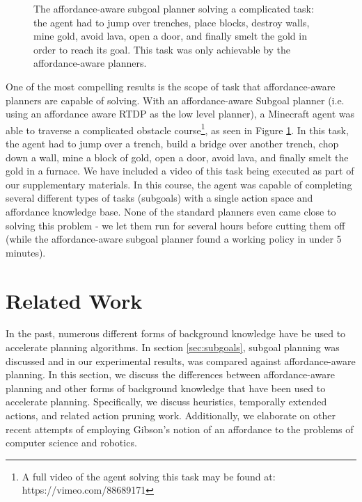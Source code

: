 \documentclass[]{article}
\begin{document}
\begin{figure}
\centering
%
%
%
%
  \caption{The affordance-aware subgoal planner solving a complicated task: the agent had to jump over trenches,
  place blocks, destroy walls, mine gold, avoid lava, open a door, and finally smelt the gold in order to reach its goal. This task
  was only achievable by the affordance-aware planners.}
  \label{fig:epicworld}
\end{figure}


One of the most compelling results is the scope of task that affordance-aware planners are capable of solving. With an affordance-aware Subgoal planner (i.e. using an affordance aware RTDP as the low level planner), a Minecraft agent was able to traverse a complicated obstacle course\footnote{A full video of the agent solving this task may be found at: https://vimeo.com/88689171}, as seen in Figure \ref{fig:epicworld}. In this task, the agent had to jump over a trench, build a bridge over another trench, chop down a wall, mine a block of gold, open a door, avoid lava, and finally smelt the gold in a furnace. We have included a video of this task being executed as part of our supplementary materials. In this course, the agent was capable of completing several different types of tasks (subgoals) with a single action space and affordance knowledge base. None of the standard planners even came close to solving this problem - we let them run for several hours before cutting them off (while the affordance-aware subgoal planner found a working policy in under 5 minutes).

\section{Related Work}
In the past, numerous different forms of background knowledge have be used to 
accelerate planning algorithms. In section \ref{sec:subgoals}, subgoal
planning was discussed and in our experimental results, was compared against affordance-aware planning. 
In this section, we discuss the differences between affordance-aware planning and other
forms of background knowledge that have been used to accelerate planning.
Specifically, we discuss heuristics, temporally extended actions, and related action pruning work.
Additionally, we elaborate on other recent attempts of employing Gibson's notion of an affordance 
to the problems of computer science and robotics.
\end{document}
